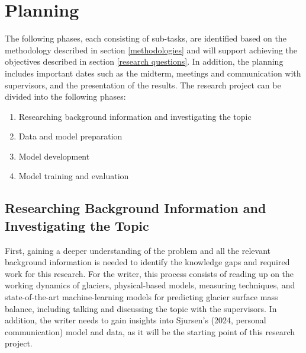 \section{Planning}



The following phases, each consisting of sub-tasks, are identified based on the methodology described in section \ref{methodologies} and will support achieving the objectives described in section \ref{research questions}. In addition, the planning includes important dates such as the midterm, meetings and communication with supervisors, and the presentation of the results. The research project can be divided into the following phases:

\begin{enumerate}
    \item Researching background information and investigating the topic
    \item Data and model preparation
    \item Model development
    \item Model training and evaluation
\end{enumerate}

\subsection{Researching Background Information and Investigating the Topic}
First, gaining a deeper understanding of the problem and all the relevant background information is needed to identify the knowledge gaps and required work for this research. For the writer, this process consists of reading up on the working dynamics of glaciers, physical-based models, measuring techniques, and state-of-the-art machine-learning models for predicting glacier surface mass balance, including talking and discussing the topic with the supervisors. In addition, the writer needs to gain insights into Sjursen's (2024, personal communication) model and data, as it will be the starting point of this research project.

